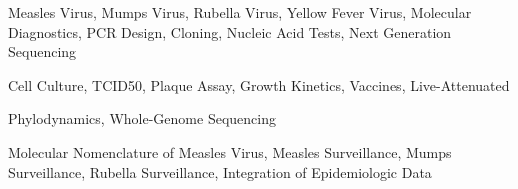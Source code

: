 


\begin{cvhonors}

  \cvhonor
    {Measles Virus, Mumps Virus, Rubella Virus, Yellow Fever Virus, Molecular Diagnostics, PCR Design, Cloning, Nucleic Acid Tests, Next Generation Sequencing} %
    {} %
    {} %
    {} %

  \cvhonor
    {Cell Culture, TCID50, Plaque Assay, Growth Kinetics, Vaccines, Live-Attenuated} %
    {} %
    {} %
    {} %
\end{cvhonors}



\begin{cvhonors}

  \cvhonor
    {Phylodynamics, Whole-Genome Sequencing} %
    {} %
    {} %
    {} %

\end{cvhonors}



\begin{cvhonors}

  \cvhonor
    {Molecular Nomenclature of Measles Virus, Measles Surveillance, Mumps Surveillance, Rubella Surveillance, Integration of Epidemiologic Data} %
    {} %
    {} %
    {} %
    
\end{cvhonors}
